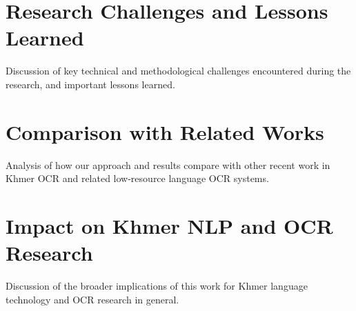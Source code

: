 \section{Research Challenges and Lessons Learned}
\label{sec:challenges}
Discussion of key technical and methodological challenges encountered during the research, and important lessons learned.

\section{Comparison with Related Works}
\label{sec:related-works}
Analysis of how our approach and results compare with other recent work in Khmer OCR and related low-resource language OCR systems.

\section{Impact on Khmer NLP and OCR Research}
\label{sec:impact}
Discussion of the broader implications of this work for Khmer language technology and OCR research in general.
